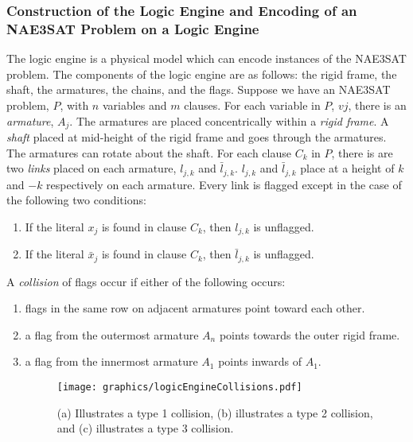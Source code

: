 \subsubsection{Construction of the Logic Engine and Encoding of an NAE3SAT Problem on a Logic 
Engine}
The logic engine is a physical model which can encode instances of the NAE3SAT problem.  The 
components of the logic engine are as follows: the rigid frame, the shaft, the armatures,
the chains, and the flags.  Suppose we have an NAE3SAT problem, $P$, with $n$ variables and $m$ 
clauses.  For each variable in $P$, $vj$, there is an \textit{armature}, $A_j$.  The armatures are 
placed concentrically within a \textit{rigid frame}.  A \textit{shaft} placed at mid-height of the 
rigid frame and goes through the armatures.  The armatures can rotate about the shaft.  For each 
clause $C_k$ in $P$, there is are two \textit{links} placed on each armature, $l_{j,k}$ and 
$\bar{l}_{j,k}$. $l_{j,k}$ and $\bar{l}_{j,k}$ place at a height of $k$ and $-k$ respectively on  
each armature.  Every link is flagged except in the case of the following two conditions:
\begin{enumerate}
 \item If the literal $x_j$ is found in clause $C_k$, then $l_{j,k}$ is unflagged.
 \item If the literal $\bar{x}_j$ is found in clause $C_k$, then $\bar{l}_{j,k}$ is unflagged.
\end{enumerate}
A \textit{collision} of flags occur if either of the following occurs:
\begin{enumerate}
\item flags in the same row on adjacent armatures point toward each other.
\item a flag from the outermost armature $A_n$ points towards the outer rigid frame.
\item a flag from the innermost armature $A_1$ points inwards of $A_1$.
\begin{figure}[!htbp]
\begin{center}
\texttt{[image: graphics/logicEngineCollisions.pdf]}
\caption{(a) Illustrates a type 1 collision, (b) illustrates a type 2 collision, and (c) 
illustrates a type 3 collision.}\label{fig:logicengine-5}
\end{center}
\end{figure}
\end{enumerate}
